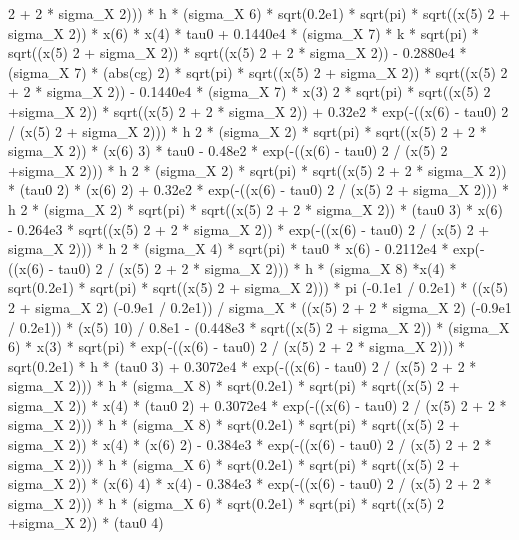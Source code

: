 \begin{maplegroup}
 2 + 2 * sigma\_X  2))) * h * (sigma\_X  6) * sqrt(0.2e1) * sqrt(pi) * sqrt((x(5)  2 + sigma\_X  2)) * x(6) * x(4) * tau0 + 0.1440e4 * (sigma\_X  7) * k * sqrt(pi) * sqrt((x(5)  2 + sigma\_X  2)) * sqrt((x(5)  2 + 2 * sigma\_X  2)) - 0.2880e4 * (sigma\_X  7) * (abs(cg)  2) * sqrt(pi) * sqrt((x(5)  2 + sigma\_X  2)) * sqrt((x(5)  2 + 2 * sigma\_X  2)) - 0.1440e4 * (sigma\_X  7) * x(3)  2 * sqrt(pi) * sqrt((x(5)  2 +sigma\_X  2)) * sqrt((x(5)  2 + 2 * sigma\_X  2)) + 0.32e2 * exp(-((x(6) - tau0)  2 / (x(5)  2 + sigma\_X  2))) * h  2 * (sigma\_X  2) * sqrt(pi) * sqrt((x(5)  2 + 2 * sigma\_X  2)) * (x(6)  3) * tau0 - 0.48e2 * exp(-((x(6) - tau0)  2 / (x(5)  2 +sigma\_X  2))) * h  2 * (sigma\_X  2) * sqrt(pi) * sqrt((x(5)  2 + 2 * sigma\_X  2)) * (tau0  2) * (x(6)  2) + 0.32e2 * exp(-((x(6) - tau0)  2 / (x(5)  2 + sigma\_X  2))) * h  2 * (sigma\_X  2) * sqrt(pi) * sqrt((x(5)  2 + 2 * sigma\_X  2)) * (tau0  3) * x(6) - 0.264e3 * sqrt((x(5)  2 + 2 * sigma\_X  2)) * exp(-((x(6) - tau0)  2 / (x(5)  2 + sigma\_X  2))) * h  2 * (sigma\_X  4) * sqrt(pi) * tau0 * x(6) - 0.2112e4 * exp(-((x(6) - tau0)  2 / (x(5)  2 + 2 * sigma\_X  2))) * h * (sigma\_X  8) *x(4) * sqrt(0.2e1) * sqrt(pi) * sqrt((x(5)  2 + sigma\_X  2))) * pi  (-0.1e1 / 0.2e1) * ((x(5)  2 + sigma\_X  2)  (-0.9e1 / 0.2e1)) / sigma\_X * ((x(5)  2 + 2 * sigma\_X  2)  (-0.9e1 / 0.2e1)) * (x(5)  10) / 0.8e1 - (0.448e3 * sqrt((x(5)  2 + sigma\_X  2)) * (sigma\_X  6) * x(3) * sqrt(pi) * exp(-((x(6) - tau0)  2 / (x(5)  2 + 2 * sigma\_X  2))) * sqrt(0.2e1) * h * (tau0  3) + 0.3072e4 * exp(-((x(6) - tau0)  2 / (x(5)  2 + 2 * sigma\_X  2))) * h * (sigma\_X  8) * sqrt(0.2e1) * sqrt(pi) * sqrt((x(5)  2 + sigma\_X  2)) * x(4) * (tau0  2) + 0.3072e4 * exp(-((x(6) - tau0)  2 / (x(5)  2 + 2 * sigma\_X  2))) * h * (sigma\_X  8) * sqrt(0.2e1) * sqrt(pi) * sqrt((x(5)  2 + sigma\_X  2)) * x(4) * (x(6)  2) - 0.384e3 * exp(-((x(6) - tau0)  2 / (x(5) 2 + 2 * sigma\_X  2))) * h * (sigma\_X  6) * sqrt(0.2e1) * sqrt(pi) * sqrt((x(5)  2 + sigma\_X  2)) * (x(6)  4) * x(4) - 0.384e3 * exp(-((x(6) - tau0)  2 / (x(5)  2 + 2 * sigma\_X  2))) * h * (sigma\_X  6) * sqrt(0.2e1) * sqrt(pi) * sqrt((x(5)  2 +sigma\_X  2)) * (tau0  4) 
\end{maplegroup}
